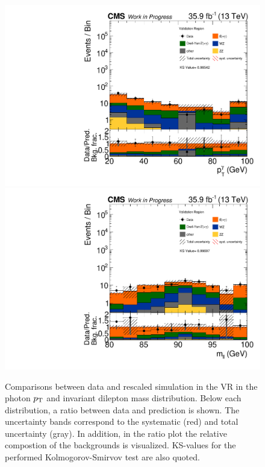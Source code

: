 \begin{figure}[tbp]
 \centering
 \includegraphics[width=\pairwidth]{figures/plots_VR/VR_LL_pt_g1_log}
 \includegraphics[width=\pairwidth]{figures/plots_VR/VR_LL_m_ll_log}
 \caption{Comparisons between data and rescaled simulation in the VR in the photon $p_{\mathrm{T}}$ and invariant dilepton mass distribution. Below each distribution, a ratio between data and prediction is shown. The uncertainty bands correspond to the systematic (red) and total uncertainty (gray). In addition, in the ratio plot the relative compostion of the backgrounds is visualized. KS-values for the performed Kolmogorov-Smirvov test are also quoted.}
 \label{fig:VR2}
\end{figure}


